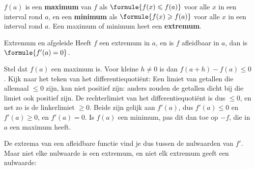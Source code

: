 \begin{theorie}
$f(a)$ is een \textbf{\textcolor{accent}{maximum}} van $f$ als $\formule{f(x) \leqslant f(a)}$ voor alle $x$ in een interval rond $a$, en een \textbf{\textcolor{accent}{minimum}} als $\formule{f(x) \geqslant f(a)}$ voor alle $x$ in een interval rond $a$. Een maximum of minimum heet een \textbf{\textcolor{accent}{extremum}}.

\begin{stelling}{Extremum en afgeleide}
Heeft $f$ een extremum in $a$, en is $f$ afleidbaar in $a$, dan is $\formule{f'(a) = 0}$.
\end{stelling}
\begin{bewijs}
Stel dat $f(a)$ een maximum is. Voor kleine $h \neq 0$ is dan $f(a + h) - f(a) \leqslant 0$. Kijk naar het teken van het differentiequotiënt:
Een limiet van getallen die allemaal $\leqslant 0$ zijn, kan niet positief zijn: anders zouden de getallen dicht bij die limiet ook positief zijn. De rechterlimiet van het differentiequotiënt is dus $\leqslant 0$, en net zo is de linkerlimiet $\geqslant 0$. Beide zijn gelijk aan $f'(a)$, dus $f'(a) \leqslant 0$ en $f'(a) \geqslant 0$, en $f'(a) = 0$. Is $f(a)$ een minimum, pas dit dan toe op $-f$, die in $a$ een maximum heeft.
\end{bewijs}
\end{theorie}

De extrema van een afleidbare functie vind je dus tussen de nulwaarden van $f'$. Maar niet elke nulwaarde is een extremum, en niet elk extremum geeft een nulwaarde:



